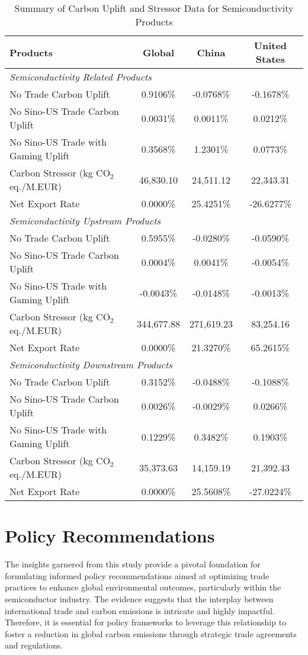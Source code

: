 \begin{table}
    \centering
    \caption{Summary of Carbon Uplift and Stressor Data for Semiconductivity Products}
    \label{tab:SummaryTable}
    \begin{tabular}{lccc}
    \hline
    \textbf{Products} & \textbf{Global} & \textbf{China} & \textbf{United States} \\
    \hline
    \multicolumn{4}{l}{\textit{Semiconductivity Related Products}} \\
    No Trade Carbon Uplift & 0.9106\% & -0.0768\% & -0.1678\% \\
    No Sino-US Trade Carbon Uplift & 0.0031\% & 0.0011\% & 0.0212\% \\
    No Sino-US Trade with Gaming Uplift & 0.3568\% & 1.2301\% & 0.0773\% \\
    Carbon Stressor (kg CO$_2$ eq./M.EUR) & 46,830.10 & 24,511.12 & 22,343.31 \\
    Net Export Rate & 0.0000\% & 25.4251\% & -26.6277\% \\
    \hline
    \multicolumn{4}{l}{\textit{Semiconductivity Upstream Products}} \\
    No Trade Carbon Uplift & 0.5955\% & -0.0280\% & -0.0590\% \\
    No Sino-US Trade Carbon Uplift & 0.0004\% & 0.0041\% & -0.0054\% \\
    No Sino-US Trade with Gaming Uplift & -0.0043\% & -0.0148\% & -0.0013\% \\
    Carbon Stressor (kg CO$_2$ eq./M.EUR) & 344,677.88 & 271,619.23 & 83,254.16 \\
    Net Export Rate & 0.0000\% & 21.3270\% & 65.2615\% \\
    \hline
    \multicolumn{4}{l}{\textit{Semiconductivity Downstream Products}} \\
    No Trade Carbon Uplift & 0.3152\% & -0.0488\% & -0.1088\% \\
    No Sino-US Trade Carbon Uplift & 0.0026\% & -0.0029\% & 0.0266\% \\
    No Sino-US Trade with Gaming Uplift & 0.1229\% & 0.3482\% & 0.1903\% \\
    Carbon Stressor (kg CO$_2$ eq./M.EUR) & 35,373.63 & 14,159.19 & 21,392.43 \\
    Net Export Rate & 0.0000\% & 25.5608\% & -27.0224\% \\
    \hline
    \end{tabular}
\end{table}

\section{Policy Recommendations}
The insights garnered from this study provide a pivotal foundation for formulating informed policy recommendations aimed at optimizing trade practices to enhance global environmental outcomes, particularly within the semiconductor industry. The evidence suggests that the interplay between international trade and carbon emissions is intricate and highly impactful. Therefore, it is essential for policy frameworks to leverage this relationship to foster a reduction in global carbon emissions through strategic trade agreements and regulations.

